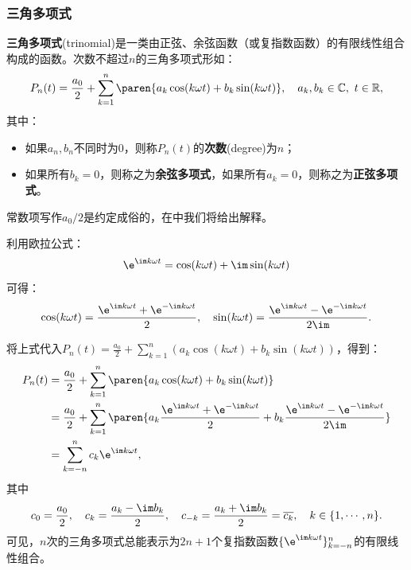\subsubsection{三角多项式}

\begin{definition}[三角多项式]\label{def:trinomial}
    \textbf{三角多项式}(trinomial)是一类由正弦、余弦函数（或复指数函数）的有限线性组合构成的函数。次数不超过$n$的三角多项式形如：
    \begin{equation}
        P_n(t)=\frac{a_0}{2}+\sum_{k=1}^n\paren{a_k\cos(k\omega t)+b_k\sin(k\omega t)},\quad a_k,b_k\in\mathbb{C},\ t\in\mathbb{R},
    \end{equation}
    其中：
    \begin{itemize}
        \item 如果$a_n,b_n$不同时为0，则称$P_n(t)$的\textbf{次数}(degree)为$n$；
        \item 如果所有$b_k=0$，则称之为\textbf{余弦多项式}，如果所有$a_k=0$，则称之为\textbf{正弦多项式}。
    \end{itemize}
    常数项写作$a_0/2$是约定成俗的，在中我们将给出解释。
\end{definition}

利用欧拉公式：
\begin{equation}
    \e^{\im k\omega t}=\cos(k\omega t)+\im\sin(k\omega t)
\end{equation}
可得：
\begin{equation}
    \cos(k\omega t)=\frac{\e^{\im k\omega t}+\e^{-\im k\omega t}}{2},\quad \sin(k\omega t)=\frac{\e^{\im k\omega t}-\e^{-\im k\omega t}}{2\im}.
\end{equation}

将上式代入$P_n(t)=\frac{a_0}{2}+\sum_{k=1}^n(a_k\cos(k\omega t)+b_k\sin(k\omega t))$，得到：
\begin{align}
    P_n(t)&=\frac{a_0}{2}+\sum_{k=1}^n\paren{a_k\cos(k\omega t)+b_k\sin(k\omega t)}\nonumber\\
    &=\frac{a_0}{2}+\sum_{k=1}^n\paren{a_k\frac{\e^{\im k\omega t}+\e^{-\im k\omega t}}{2}+b_k\frac{\e^{\im k\omega t}-\e^{-\im k\omega t}}{2\im}}\nonumber\\
    &=\sum_{k=-n}^n c_k\e^{\im k\omega t},
\end{align}
其中
\begin{equation}
    c_0=\frac{a_0}{2},\quad c_k=\frac{a_k-\im b_k}{2},\quad c_{-k}=\frac{a_k+\im b_k}{2}=\overline{c_k},\quad k\in\{1,\cdots,n\}.
\end{equation}
可见，$n$次的三角多项式总能表示为$2n+1$个复指数函数$\{\e^{\im k\omega t}\}_{k=-n}^n$的有限线性组合。

